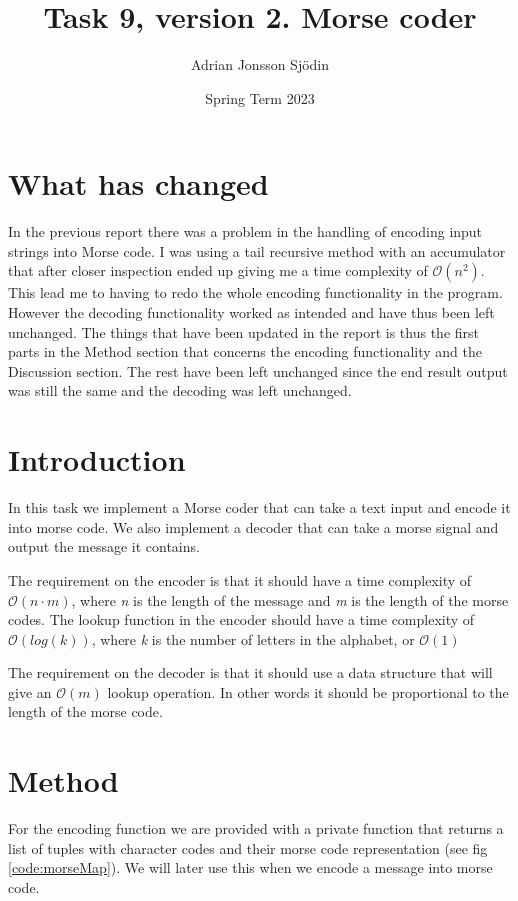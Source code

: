 \documentclass[a4paper,11pt]{article}
\begin{document}
\title{
    \textbf{Task 9, version 2. Morse coder}
}
\author{Adrian Jonsson Sjödin}
\date{Spring Term 2023}

\maketitle
\section*{What has changed}
In the previous report there was a problem in the handling of encoding input strings into Morse code. I was using a tail 
recursive method with an accumulator that after closer inspection ended up giving me a time complexity of $\mathcal{O}(n^2)$.
This lead me to having to redo the whole encoding functionality in the program. However the decoding functionality worked as
intended and have thus been left unchanged. The things that have been updated in the report is thus the first parts in the 
Method section that concerns the encoding functionality and the Discussion section. The rest have been left unchanged since 
the end result output was still the same and the decoding was left unchanged.
\section*{Introduction}
In this task we implement a Morse coder that can take a text input and encode it into morse code. We also implement a decoder that 
can take a morse signal and output the message it contains. 

The requirement on the encoder is that it should have a time complexity 
of $\mathcal{O}(n\cdot m)$, where \textit{n} is the length of the message and \textit{m} is the length of the morse codes. The lookup 
function in the encoder should have a time complexity of $\mathcal{O}(log(k))$, where \textit{k} is the number of letters in the 
alphabet, or $\mathcal{O}(1)$

The requirement on the decoder is that it should use a data structure that will give an $\mathcal{O}(m)$ lookup operation. In other words 
it should be proportional to the length of the morse code.

\section*{Method}
For the encoding function we are provided with a private function that returns a list of tuples with character codes and their morse code 
representation (see fig \ref{code:morseMap}). We will later use this when we encode a message into morse code.
\end{document}
